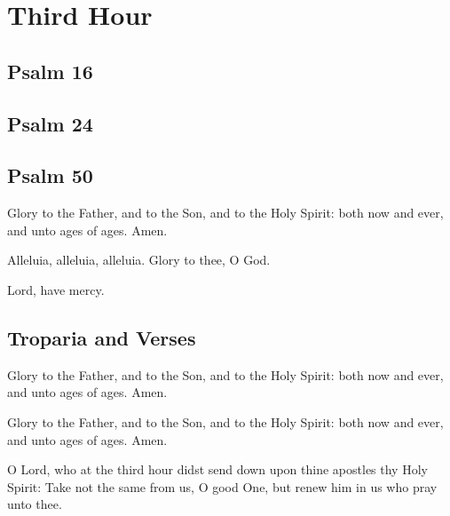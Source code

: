 \section{Third Hour}



\subsection{Psalm 16}



\subsection{Psalm 24}



\subsection{Psalm 50}



Glory to the Father, and to the Son, and to the Holy Spirit: both now and ever, and unto ages of ages. Amen.

Alleluia, alleluia, alleluia. Glory to thee, O God. 

Lord, have mercy. 

\subsection{Troparia and Verses}


Glory to the Father, and to the Son, and to the Holy Spirit: both now and ever, and unto ages of ages. Amen.


Glory to the Father, and to the Son, and to the Holy Spirit: both now and ever, and unto ages of ages. Amen.

O Lord, who at the third hour didst send down upon thine apostles thy Holy Spirit: Take not the same from us, O good One, but renew him in us who pray unto thee. 

